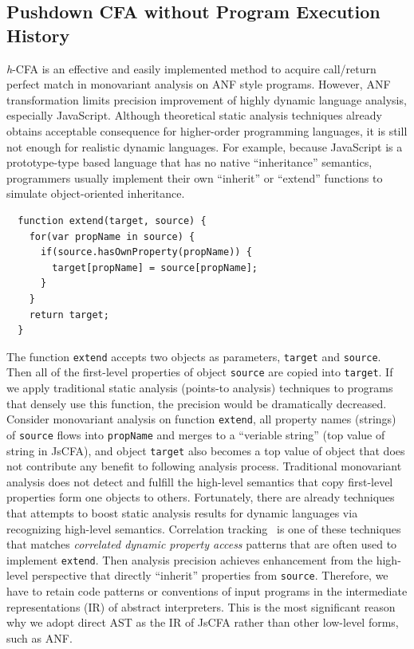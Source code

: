 \documentclass{article}
\begin{document}
\subsection{Pushdown CFA without Program Execution History}
\label{sub:pushdown-jscfa}
\textit{h}-CFA is an effective and easily implemented method to acquire call/return perfect match in monovariant analysis on ANF style programs. However, ANF transformation limits precision improvement of highly dynamic language analysis, especially JavaScript.
Although theoretical static analysis techniques already obtains acceptable consequence for higher-order programming languages, it is still not enough for realistic dynamic languages. For example, because JavaScript is a prototype-type based language that has no native ``inheritance'' semantics, programmers usually implement their own ``inherit'' or ``extend'' functions to simulate object-oriented inheritance.
\begin{lstlisting}
  function extend(target, source) {
    for(var propName in source) {
      if(source.hasOwnProperty(propName)) {
        target[propName] = source[propName];
      }
    }
    return target;
  }
\end{lstlisting}
The function \verb|extend| accepts two objects as parameters, \verb|target| and \verb|source|.
Then all of the first-level properties of object \verb|source| are copied into \verb|target|. If we apply traditional static analysis (points-to analysis) techniques to programs that densely use this function, the precision would be dramatically decreased.
Consider monovariant analysis on function \verb|extend|, all property names (strings) of \verb|source| flows into \verb|propName| and merges to a ``veriable string'' (top value of string in JsCFA), and object \verb|target| also becomes a top value of object that does not contribute any benefit to following analysis process.
Traditional monovariant analysis does not detect and fulfill the high-level semantics that copy first-level properties form one objects to others.
Fortunately, there are already techniques that attempts to boost static analysis results for dynamic languages via recognizing high-level semantics.
Correlation tracking~\cite{sridharan2012correlation}
is one of these techniques that matches \emph{correlated dynamic property access} patterns that are often used to implement \verb|extend|. Then analysis precision achieves enhancement from the high-level perspective that directly ``inherit'' properties from \verb|source|.
Therefore, we have to retain code patterns or conventions of input programs in the intermediate representations (IR) of abstract interpreters.
This is the most significant reason why we adopt direct AST as the IR of JsCFA rather than other low-level forms, such as ANF\@.
\end{document}
